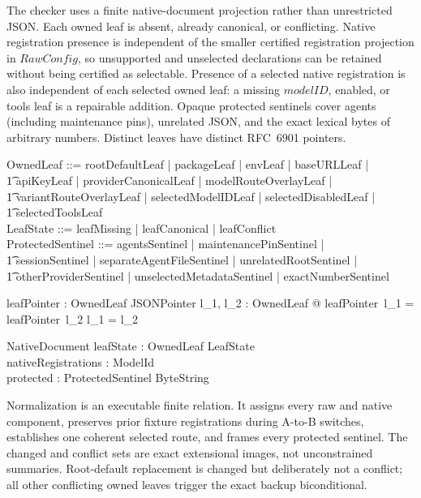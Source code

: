 \documentclass{article}
\begin{document}
The checker uses a finite native-document projection rather than unrestricted
JSON.  Each owned leaf is absent, already canonical, or conflicting.  Native
registration presence is independent of the smaller certified registration
projection in $RawConfig$, so unsupported and unselected declarations can be
retained without being certified as selectable.  Presence of a selected native
registration is also independent of each selected owned leaf: a missing
$modelID$, enabled, or tools leaf is a repairable addition.  Opaque protected
sentinels cover agents (including maintenance pins), unrelated JSON, and the
exact lexical bytes of arbitrary numbers.  Distinct leaves have distinct
RFC~6901 pointers.

\begin{zed}
	OwnedLeaf ::= rootDefaultLeaf | packageLeaf | envLeaf | baseURLLeaf | \\
	\t1 apiKeyLeaf | providerCanonicalLeaf | modelRouteOverlayLeaf | \\
	\t1 variantRouteOverlayLeaf | selectedModelIDLeaf | selectedDisabledLeaf | \\
	\t1 selectedToolsLeaf \\
	LeafState ::= leafMissing | leafCanonical | leafConflict \\
	ProtectedSentinel ::= agentsSentinel | maintenancePinSentinel | \\
	\t1 sessionSentinel | separateAgentFileSentinel | unrelatedRootSentinel | \\
	\t1 otherProviderSentinel | unselectedMetadataSentinel | exactNumberSentinel
\end{zed}

\begin{axdef}
	leafPointer : OwnedLeaf \fun JSONPointer
	\where
	\forall l_1, l_2 : OwnedLeaf @
	leafPointer~l_1 = leafPointer~l_2 \implies l_1 = l_2
\end{axdef}

\begin{schema}{NativeDocument}
	leafState : OwnedLeaf \fun LeafState \\
	nativeRegistrations : \power ModelId \\
	protected : ProtectedSentinel \fun ByteString
\end{schema}

Normalization is an executable finite relation.  It assigns every raw and
native component, preserves prior fixture registrations during A-to-B switches,
establishes one coherent selected route, and frames every protected sentinel.
The changed and conflict sets are exact extensional images, not unconstrained
summaries.  Root-default replacement is changed but deliberately not a conflict;
all other conflicting owned leaves trigger the exact backup biconditional.
\end{document}
